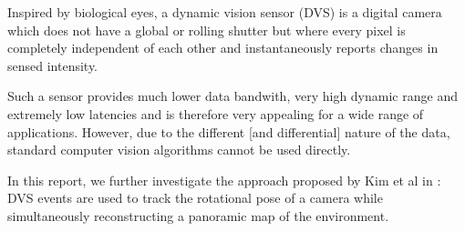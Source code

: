 Inspired by biological eyes, a dynamic vision sensor (DVS) is a digital camera
which does not have a global or rolling shutter but where every pixel is
completely independent of each other and instantaneously reports changes in
sensed intensity.

Such a sensor provides much lower data bandwith, very high dynamic range and
extremely low latencies and is therefore very appealing for a wide range of
applications. However, due to the different [and differential] nature of the
data, standard computer vision algorithms cannot be used directly.

In this report, we further investigate the approach proposed by Kim et al in
\cite{kim2014simultaneous}: DVS events are used to track the rotational pose of
a camera while simultaneously reconstructing a panoramic map of the
environment.
